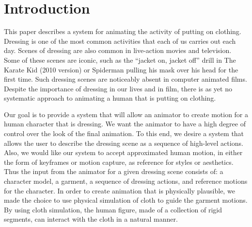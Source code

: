 \section{Introduction}


This paper describes a system for animating the activity of putting on
clothing.  Dressing is one of the most common activities that each of us
carries out each day.  Scenes of dressing are also common in live-action
movies and television.  Some of these scenes are iconic, such as the
``jacket on, jacket off'' drill in The Karate Kid (2010 version) or
Spiderman pulling his mask over his head for the first time.  Such
dressing scenes are noticeably absent in computer animated films.  Despite
the importance of dressing in our lives and in film, there is as yet no
systematic approach to animating a human that is putting on clothing.

%

Our goal is to provide a system that will allow an animator to create
motion for a human character that is dressing.  We want the animator to
have a high degree of control over the look of the final animation.  To
this end, we desire a system that allows the user to describe the dressing scene as a sequence
of high-level actions.  Also, we would like our system to
accept approximated human motion, in either the form of keyframes or
motion capture, as reference for styles or aesthetics.  Thus the input from
the animator for a given dressing scene consists of: a character model,
a garment, a sequence of dressing actions, and reference
motions for the character. In order to create animation that is
physically plausible, we made the choice to use physical simulation of
cloth to guide the garment motions. By using cloth simulation, the
human figure, made of a collection of rigid segments, can interact
with the cloth in a natural manner.
 

